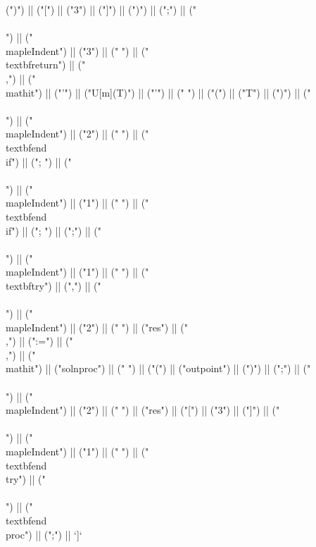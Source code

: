 \documentclass{article}
\begin{document}
\begin{center}
\begin{maplelatex}
{(")") || ("[") || ("3") || ("]") || (")") || (";") || ("\\\\\n") || ("\\mapleIndent{") || ("3") || ("} ") || ("\\textbf{return}") || ("\\,") || ("\\mathit{") || ("'") || ("U[m](T)") || ("'") || ("} ") || ("(") || ("T") || (")") || ("\\\\\n") || ("\\mapleIndent{") || ("2") || ("} ") || ("\\textbf{end\\ if}") || ("; ") || ("\\\\\n") || ("\\mapleIndent{") || ("1") || ("} ") || ("\\textbf{end\\ if}") || ("; ") || (";") || ("\\\\\n") || ("\\mapleIndent{") || ("1") || ("} ") || ("\\textbf{try}") || (",") || ("\\\\\n") || ("\\mapleIndent{") || ("2") || ("} ") || ("res") || ("\\,") || (":=") || ("\\,") || ("\\mathit{") || ("solnproc") || ("} ") || ("(") || ("outpoint") || (")") || (";") || ("\\\\\n") || ("\\mapleIndent{") || ("2") || ("} ") || ("res") || ("[") || ("3") || ("]") || ("\\\\\n") || ("\\mapleIndent{") || ("1") || ("} ") || ("\\textbf{end\\ try}") || ("\\\\\n") || ("\\textbf{end\\ proc}") || (";") || `]`\]}
\end{maplelatex}\end{center}\begin{maplelatex}
\end{maplelatex}
\end{document}
